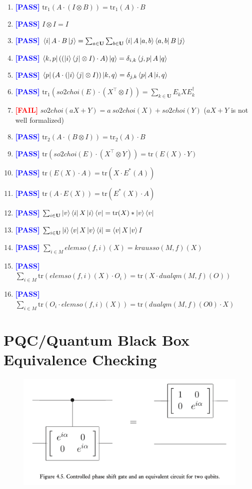 \documentclass[manuscript, review, timestamp]{acmart}
\newcommand{\tr}{\mathrm{tr}}
\newcommand{\pass}{\textcolor{blue}{\textbf{ [PASS] }}}
\newcommand{\fail}{\textcolor{red}{\textbf{ [FAIL] }}}
\begin{document}
\begin{enumerate}
  \item \pass $\tr_1 (A \cdot (I \otimes B)) = \tr_1 (A) \cdot B$
  \item \pass $I \otimes I = I$
  \item \pass $\bra{i} A \cdot B \ket{j} = \sum_{a\in\mathbf{U}} \sum_{b\in\mathbf{U}} \bra{i}A\ket{a,b}\bra{a,b}B\ket{j}$
  \item \pass $\bra{k,p} ((\ket{i}\bra{j} \otimes I) \cdot A) \ket{q} = \delta_{i, k} \bra{j, p} A \ket{q}$
  \item \pass $\bra{p} (A \cdot (\ket{i}\bra{j} \otimes I)) \ket{k, q} = \delta_{j, k} \bra{p} A \ket{i, q}$
  \item \pass $\tr_1(so2choi(E) \cdot (X^\top \otimes I)) = \sum_{k\in\mathbf{U}} E_k X E_k^\dagger$
  \item \fail $so2choi(a X + Y) =a\ so2choi(X) + so2choi(Y)$ ($aX + Y$ is not well formalized)
  \item \pass $\tr_2(A \cdot (B \otimes I)) = \tr_2(A) \cdot B$
  \item \pass $\tr (so2choi(E)\cdot (X^\top \otimes Y)) = \tr(E(X) \cdot Y)$
  \item \pass $\tr (E(X) \cdot A) = \tr (X \cdot E^*(A))$
  \item \pass $\tr (A \cdot E(X)) = \tr (E^*(X) \cdot A)$
  \item \pass $\sum_{i \in \mathbf{U}} \ket{v}\bra{i} X \ket{i}\bra{v} = \tr(X) * \ket{v}\bra{v}$
  \item \pass $\sum_{i \in \mathbf{U}} \ket{i}\bra{v}X\ket{v}\bra{i} = \bra{v}X\ket{v} I$
  \item \pass $\sum_{i \in M} elemso(f, i)(X) = krausso(M, f)(X)$
  \item \pass $\sum_{i \in M} \tr(elemso(f,i)(X)\cdot O_i) = \tr (X \cdot dualqm(M, f)(O))$
  \item \pass $\sum_{i \in M} \tr(O_i \cdot elemso(f,i)(X)) = \tr (dualqm(M,f)(O0)\cdot X)$
\end{enumerate}

\clearpage
\appendix 

\section{PQC/Quantum Black Box Equivalence Checking}
\begin{figure}[h]
  \includegraphics*[width=\textwidth]{QCQI.Fig4.5.png}
\end{figure}
\end{document}
